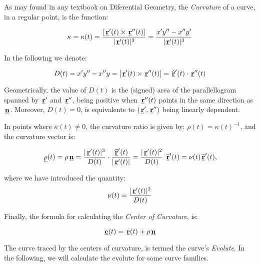 
As may found in any textbook on Diferential Geometry, the \emph{Curvature} of a curve, in
a regular point, is the function:

\[
 \kappa=\kappa(t)
 =
 \frac{ \left[ \hspace{0.05cm} \underline{\mathbf{r}}'(t) \times \hspace{0.05cm} \underline{\mathbf{r}}''(t)\right] }{ |\hspace{0.05cm} \underline{\mathbf{r}}'(t)|^3}
 =
 \frac{ x'y''-x''y' }{ |\hspace{0.05cm} \underline{\mathbf{r}}'(t)|^3}
\]

In the following we denote:

\[
 D(t)=
 x'y''-x''y
 =
 \left[ \hspace{0.05cm} \underline{\mathbf{r}}'(t) \times \hspace{0.05cm} \underline{\mathbf{r}}''(t)\right]
 =
 \hspace{0.05cm} \underline{\mathbf{ \widehat{r} }}'(t) \cdot \hspace{0.05cm} \underline{\mathbf{ r}}''(t)
\]

Geometrically, the value of $D(t)$ is the (signed) area of the parallellogram
spanned by $\hspace{0.05cm} \underline{\mathbf{r}}'$ and $\hspace{0.05cm} \underline{\mathbf{r}}''$, being positive when 
$\hspace{0.05cm} \underline{\mathbf{ r}}''(t)$ points in the same direction as $\hspace{0.05cm} \underline{\mathbf{n}}$.
Moreover, $D(t)=0$, is equivalente to
$(\hspace{0.05cm} \underline{\mathbf{r}}',\hspace{0.05cm} \underline{\mathbf{r}}'')$ being linearly dependent.

In points where $\kappa(t) \neq 0$, the curvature ratio is given by: $\rho(t)=\kappa(t)^{-1}$,
and the curvature vector is:


\[
\hspace{0.05cm} \underline{\mathbf{\rho}}(t)
=
 \rho \hspace{0.05cm} \underline{\mathbf{n}}
 =
 \frac 
 {
  |\hspace{0.05cm} \underline{\mathbf{r}}'(t)|^3
  }
  {
    D(t)
  }
  \cdot 
  \frac{ \hspace{0.05cm} \underline{\mathbf{\widehat{r}}}'(t)  }{ |\hspace{0.05cm} \underline{\mathbf{r}}'(t)| }
  =
 \frac 
 {
  |\hspace{0.05cm} \underline{\mathbf{r}}'(t)|^2
  }
  {
    D(t)
  }
  ~
  \hspace{0.05cm} \underline{\mathbf{\widehat{r} }}'(t)
  =
  \nu(t) \hspace{0.05cm} \underline{\mathbf{\widehat{r} }}'(t),
\]

where we have introduced the quantity:
\[
 \nu(t)=
 \frac 
 {
  |\hspace{0.05cm} \underline{\mathbf{r}}'(t)|^2
  }
  {
    D(t)
  }
\]


Finally, the formula for calculating the \emph{Center of Curvature}, is:

\[
 \hspace{0.05cm} \underline{\mathbf{c}}(t)
 =
 \hspace{0.05cm} \underline{\mathbf{r}}(t)+\rho \hspace{0.05cm} \underline{\mathbf{n}}
\]

The curve traced by the centers of curvature, is termed the curve's \emph{Evolute}. In the following,
we will calculate the evolute for some curve families.